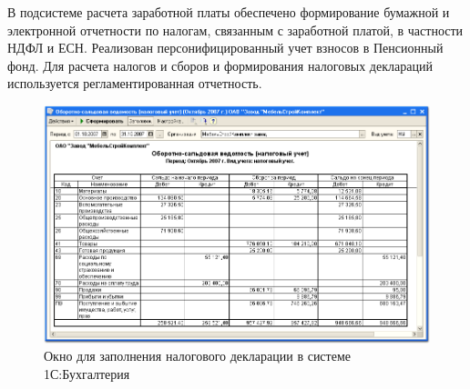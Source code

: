 \documentclass[14pt,a4paper]{reportmod}
\begin{document}
В подсистеме расчета заработной платы обеспечено формирование бумажной и электронной отчетности по налогам, связанным с заработной платой, в частности НДФЛ и ЕСН. Реализован персонифицированный учет взносов в Пенсионный фонд. Для расчета налогов и сборов и формирования налоговых деклараций используется регламентированная отчетность.
\begin{figure}
  \centering
  \includegraphics[scale=0.5]{pics/1c_image2}
  \caption{Окно для заполнения налогового декларации в системе 1С:Бухгалтерия}
  \label{pic:1c_image2}
\end{figure}
\end{document}
